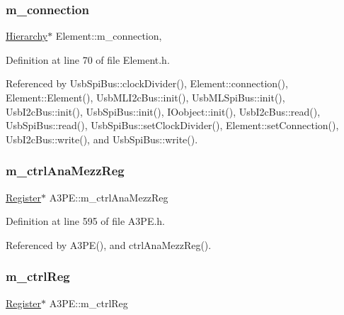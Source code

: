 \subsubsection{\texorpdfstring{m\+\_\+connection}{m\_connection}}
{\footnotesize\ttfamily \hyperlink{classHierarchy}{Hierarchy}$\ast$ Element\+::m\+\_\+connection\hspace{0.3cm}{\ttfamily [protected]}, {\ttfamily [inherited]}}



Definition at line 70 of file Element.\+h.



Referenced by Usb\+Spi\+Bus\+::clock\+Divider(), Element\+::connection(), Element\+::\+Element(), Usb\+M\+L\+I2c\+Bus\+::init(), Usb\+M\+L\+Spi\+Bus\+::init(), Usb\+I2c\+Bus\+::init(), Usb\+Spi\+Bus\+::init(), I\+Oobject\+::init(), Usb\+I2c\+Bus\+::read(), Usb\+Spi\+Bus\+::read(), Usb\+Spi\+Bus\+::set\+Clock\+Divider(), Element\+::set\+Connection(), Usb\+I2c\+Bus\+::write(), and Usb\+Spi\+Bus\+::write().

\mbox{\label{classA3PE_a126a936a5fd4fd4b83485b3637e1fa84}} 
\subsubsection{\texorpdfstring{m\+\_\+ctrl\+Ana\+Mezz\+Reg}{m\_ctrlAnaMezzReg}}
{\footnotesize\ttfamily \hyperlink{classRegister}{Register}$\ast$ A3\+P\+E\+::m\+\_\+ctrl\+Ana\+Mezz\+Reg\hspace{0.3cm}{\ttfamily [private]}}



Definition at line 595 of file A3\+P\+E.\+h.



Referenced by A3\+P\+E(), and ctrl\+Ana\+Mezz\+Reg().

\mbox{\label{classA3PE_a264834484dd6326ebad58c2a3e1be9a6}} 
\subsubsection{\texorpdfstring{m\+\_\+ctrl\+Reg}{m\_ctrlReg}}
{\footnotesize\ttfamily \hyperlink{classRegister}{Register}$\ast$ A3\+P\+E\+::m\+\_\+ctrl\+Reg\hspace{0.3cm}{\ttfamily [private]}}



